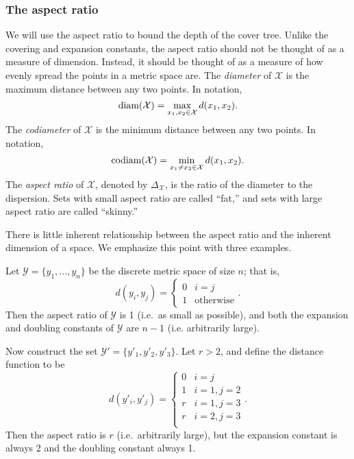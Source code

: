 \documentclass[../main.tex]{subfiles}
\newcommand{\set}[1]{\mathcal {#1}}
\newcommand{\dist}[2]{\distf({#1},{#2})}
\newcommand{\distf}{d}
\newcommand{\diam}[1]{\textnormal{diam}({#1})}
\newcommand{\codiam}[1]{\textnormal{codiam}({#1})}
\newcommand{\aspect}[1]{\Delta_{#1}}
\begin{document}
\fixme{}


\subsubsection{The aspect ratio}

We will use the aspect ratio to bound the depth of the cover tree.
Unlike the covering and expansion constants,
the aspect ratio should not be thought of as a measure of dimension.
Instead, it should be thought of as a measure of how evenly spread the points in a metric space are.
The \emph{diameter} of $\set X$ is the maximum distance between any two points.
In notation,
\begin{equation}
    \diam {\set X} = \max_{x_1,x_2\in\set X} \dist{x_1}{x_2}
    .
\end{equation}
The \emph{codiameter} of $\set X$ is the minimum distance between any two points.
In notation,
\begin{equation}
    \codiam {\set X} = \min_{x_1 \ne x_2\in\set X} \dist{x_1}{x_2}
    .
\end{equation}
The \emph{aspect ratio} of $\set X$, denoted by $\aspect{\set X}$, 
is the ratio of the diameter to the dispersion.
Sets with small aspect ratio are called ``fat,''
and sets with large aspect ratio are called ``skinny.''

There is little inherent relationship between the aspect ratio and the inherent dimension of a space.
We emphasize this point with three examples.

\begin{example}
    Let $\set Y=\{y_1,...,y_n\}$ be the discrete metric space of size $n$;
    that is,
    \begin{equation}
        \dist{y_i}{y_j}=
        \begin{cases}
            0 & i = j \\
            1 & \text{otherwise}
        \end{cases}
        .
    \end{equation}
    Then the aspect ratio of $\set Y$ is 1 (i.e.\ as small as possible),
    and both the expansion and doubling constants of $\set Y$ are $n-1$ (i.e. arbitrarily large).
\end{example}

\begin{example}
    Now construct the set $\set Y'=\{y'_1, y'_2, y'_3\}$.
    Let $r>2$, and define the distance function to be
    \begin{equation}
        d(y'_i,y'_j) =
        \begin{cases}
            0 & i=j \\
            1 & i=1, j=2 \\
            r & i=1, j=3 \\
            r & i=2, j=3 \\
        \end{cases}
        .
    \end{equation}
    Then the aspect ratio is $r$ (i.e.\ arbitrarily large),
    but the expansion constant is always 2
    and the doubling constant always 1.
\end{example}
\end{document}

